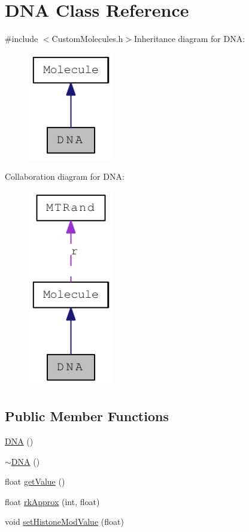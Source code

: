 \hypertarget{classDNA}{
\section{DNA Class Reference}
\label{classDNA}
}


{\ttfamily \#include $<$CustomMolecules.h$>$}Inheritance diagram for DNA:\nopagebreak
\begin{figure}[H]
\begin{center}
\leavevmode
\includegraphics[width=106pt]{classDNA__inherit__graph}
\end{center}
\end{figure}
Collaboration diagram for DNA:\nopagebreak
\begin{figure}[H]
\begin{center}
\leavevmode
\includegraphics[width=106pt]{classDNA__coll__graph}
\end{center}
\end{figure}
\subsection*{Public Member Functions}
\begin{DoxyCompactItemize}
\item 
\hyperlink{classDNA_a3bad49a2b4f2afcc3a55f1d663e2d14e}{DNA} ()
\item 
\hyperlink{classDNA_ae839223a414026e083f5ba7491979e78}{$\sim$DNA} ()
\item 
float \hyperlink{classDNA_ac3f4ef00894483313ea44df6a85b3bab}{getValue} ()
\item 
float \hyperlink{classDNA_a10bec8cdc5922b2780887666c53891f1}{rkApprox} (int, float)
\item 
void \hyperlink{classDNA_aace4054119b4953683f23b2a0a9fd57c}{setHistoneModValue} (float)
\end{DoxyCompactItemize}

